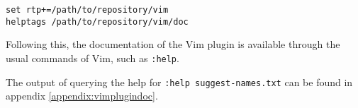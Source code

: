\begin{lstlisting}
set rtp+=/path/to/repository/vim
helptags /path/to/repository/vim/doc
\end{lstlisting}

Following this, the documentation of the Vim plugin is available through the
usual commands of Vim, such as \lstinline|:help|.

The output of querying the help for \lstinline|:help suggest-names.txt| can be
found in appendix \ref{appendix:vimplugindoc}.
